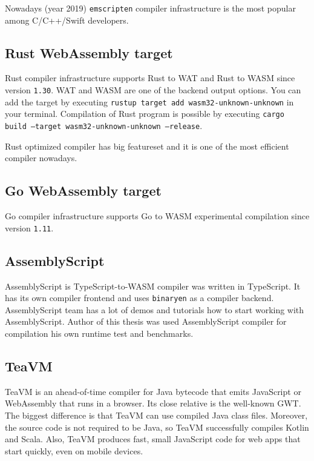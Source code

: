Nowadays (year 2019) \texttt{emscripten} compiler infrastructure is the most popular among C/C++/Swift developers.

\subsection{Rust WebAssembly target} \mbox{}

\indent  Rust compiler infrastructure supports Rust to WAT and Rust to WASM since version \texttt{1.30}.
WAT and WASM are one of the backend output options.
You can add the target by executing \texttt{rustup target add wasm32-unknown-unknown} in your terminal.
Compilation of Rust program is possible by executing \texttt{cargo build --target wasm32-unknown-unknown --release}.

Rust optimized compiler has big featureset and it is one of the most efficient compiler nowadays.

\subsection{Go WebAssembly target} \mbox{}

Go compiler infrastructure supports Go to WASM experimental compilation since version \texttt{1.11}.

\subsection{AssemblyScript} \mbox{}

\indent AssemblyScript is TypeScript-to-WASM compiler was written in TypeScript.
It has its own compiler frontend and uses \texttt{binaryen} as a compiler backend. 
AssemblyScript team has a lot of demos and tutorials how to start working with AssemblyScript.
Author of this thesis was used AssemblyScript compiler for compilation his own runtime test and benchmarks.

\subsection{TeaVM}

TeaVM is an ahead-of-time compiler for Java bytecode that emits JavaScript or WebAssembly that runs in a browser.
Its close relative is the well-known GWT.
The biggest difference is that TeaVM can use compiled Java class files.
Moreover, the source code is not required to be Java, so TeaVM successfully compiles Kotlin and Scala. \cite{wasm_tea}
Also, TeaVM produces fast, small JavaScript code for web apps that start quickly, even on mobile devices.

